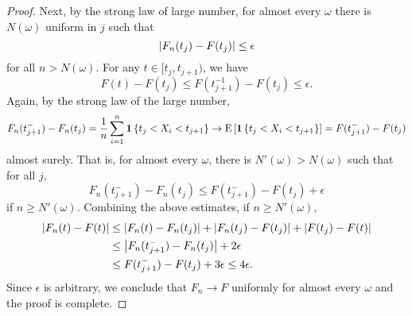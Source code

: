 \begin{proof}
    Next, by the strong law of large number, for almost every $\omega$ 
    there is $N(\omega)$ uniform in $j$ such that 
    \begin{equation*}
        \left\lvert {F_n(t_j) - F(t_j)} \right\rvert \leq \epsilon
    \end{equation*}
    for all $n>N(\omega)$. For any $t\in[t_j, t_{j+1})$, we have 
    \begin{equation*}
        F(t) - F(t_j) \leq F(t_{j+1}^{-1}) - F(t_j) \leq \epsilon. 
    \end{equation*}
    Again, by the strong law of the large number, 
    \begin{equation*}
        F_n(t_{j+1}^-) - F_n(t_j) = \frac{1}{n}\sum_{i=1}^n\mathbf{1}\left\{ {t_j < X_i < t_{j+1}} \right\}
        \to \operatorname{E}\left[ {\mathbf{1}\left\{ {t_j < X_i < t_{j+1}} \right\}} \right] = F(t_{j+1}^-) - F(t_j)
    \end{equation*}
    almost surely. That is, for almost every $\omega$, there is $N'(\omega)>N(\omega)$ 
    such that for all $j$, 
    \begin{equation*}
        F_n(t_{j+1}^-) - F_n(t_j) \leq F(t_{j+1}^-) - F(t_j) + \epsilon
    \end{equation*}
    if $n\geq N'(\omega)$. Combining the above estimates, if $n\geq N'(\omega)$, 
    \begin{equation*}
        \begin{split}
            \left\lvert {F_n(t)-F(t)} \right\rvert &\leq \left\lvert {F_n(t) - F_n(t_j)} \right\rvert + \left\lvert {F_n(t_j) - F(t_j)} \right\rvert 
            + \left\lvert {F(t_j) - F(t)} \right\rvert \\
            &\leq \left\lvert {F_n(t_{j+1}^-) - F_n(t_j)} \right\rvert + 2\epsilon \\ 
            &\leq F(t_{j+1}^-) - F(t_j) + 3\epsilon \leq 4\epsilon. 
        \end{split}
    \end{equation*}
    Since $\epsilon$ is arbitrary, we conclude that $F_n\to F$ uniformly for 
    almost every $\omega$ and the proof is complete. 
\end{proof}
